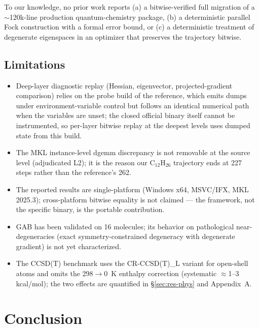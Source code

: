 \documentclass[preprint,12pt]{elsarticle}
\begin{document}
To our knowledge, no prior work reports (a) a bitwise-verified full migration of a $\sim$120k-line production quantum-chemistry package, (b) a deterministic parallel Fock construction with a formal error bound, or (c) a deterministic treatment of degenerate eigenspaces in an optimizer that preserves the trajectory bitwise.

\subsection{Limitations}\label{sec:disc-lim}

\begin{itemize}
\item Deep-layer diagnostic replay (Hessian, eigenvector, projected-gradient comparison) relies on the probe build of the reference, which emits dumps under environment-variable control but follows an identical numerical path when the variables are unset; the closed official binary itself cannot be instrumented, so per-layer bitwise replay at the deepest levels uses dumped state from this build.
\item The MKL instance-level dgemm discrepancy is not removable at the source level (adjudicated L2); it is the reason our C$_{12}$H$_{26}$ trajectory ends at 227 steps rather than the reference's 262.
\item The reported results are single-platform (Windows x64, MSVC/IFX, MKL 2025.3); cross-platform bitwise equality is not claimed --- the framework, not the specific binary, is the portable contribution.
\item GAB has been validated on 16 molecules; its behavior on pathological near-degeneracies (exact symmetry-constrained degeneracy with degenerate gradient) is not yet characterized.
\item The CCSD(T) benchmark uses the CR-CCSD(T)\_L variant for open-shell atoms and omits the 298$\to$0~K enthalpy correction (systematic $\approx$1--3\,kcal/mol); the two effects are quantified in \S\ref{sec:res-phys} and Appendix~A.
\end{itemize}

\section{Conclusion}\label{sec:concl}
\end{document}
